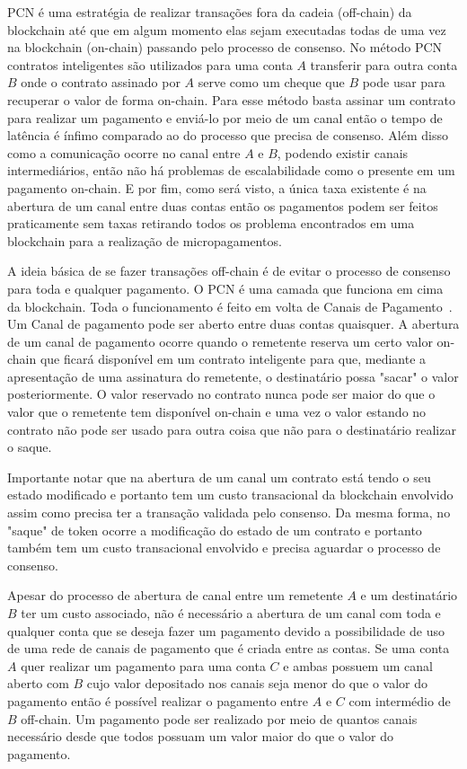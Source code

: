 \documentclass[12pt]{article}
\begin{document}
PCN é uma estratégia de realizar transações fora da cadeia (off-chain) da blockchain até que em algum momento elas sejam executadas todas de uma vez na blockchain (on-chain) passando pelo processo de consenso\cite{mercan2021cryptocurrency}. No método PCN contratos inteligentes são utilizados para uma conta $A$ transferir para outra conta $B$ onde o contrato assinado por $A$ serve como um cheque que $B$ pode usar para recuperar o valor de forma on-chain. Para esse método basta assinar um contrato para realizar um pagamento e enviá-lo por meio de um canal então o tempo de latência é ínfimo comparado ao do processo que precisa de consenso. Além disso como a comunicação ocorre no canal entre $A$ e $B$, podendo existir canais intermediários, então não há problemas de escalabilidade como o presente em um pagamento on-chain. E por fim, como será visto, a única taxa existente é na abertura de um canal entre duas contas então os pagamentos podem ser feitos praticamente sem taxas retirando todos os problema encontrados em uma blockchain para a realização de micropagamentos.

A ideia básica de se fazer transações off-chain é de evitar o processo de consenso para toda e qualquer pagamento. O PCN é uma camada que funciona em cima da blockchain. Toda o funcionamento é feito em volta de Canais de Pagamento~\cite{raidenmedium}. Um Canal de pagamento pode ser aberto entre duas contas quaisquer. A abertura de um canal de pagamento ocorre quando o remetente reserva um certo valor on-chain que ficará disponível em um contrato inteligente para que, mediante a apresentação de uma assinatura do remetente, o destinatário possa "sacar" o valor posteriormente. O valor reservado no contrato nunca pode ser maior do que o valor que o remetente tem disponível on-chain e uma vez o valor estando no contrato não pode ser usado para outra coisa que não para o destinatário realizar o saque.

Importante notar que na abertura de um canal um contrato está tendo o seu estado modificado e portanto tem um custo transacional da blockchain envolvido assim como precisa ter a transação validada pelo consenso. Da mesma forma, no "saque" de token ocorre a modificação do estado de um contrato e portanto também tem um custo transacional envolvido e precisa aguardar o processo de consenso.

Apesar do processo de abertura de canal entre um remetente $A$ e um destinatário $B$ ter um custo associado, não é necessário a abertura de um canal com toda e qualquer conta que se deseja fazer um pagamento devido a possibilidade de uso de uma rede de canais de pagamento que é criada entre as contas. Se uma conta $A$ quer realizar um pagamento para uma conta $C$ e ambas possuem um canal aberto com $B$ cujo valor depositado nos canais seja menor do que o valor do pagamento então é possível realizar o pagamento entre $A$ e $C$ com intermédio de $B$ off-chain. Um pagamento pode ser realizado por meio de quantos canais necessário desde que todos possuam um valor maior do que o valor do pagamento.
\end{document}

